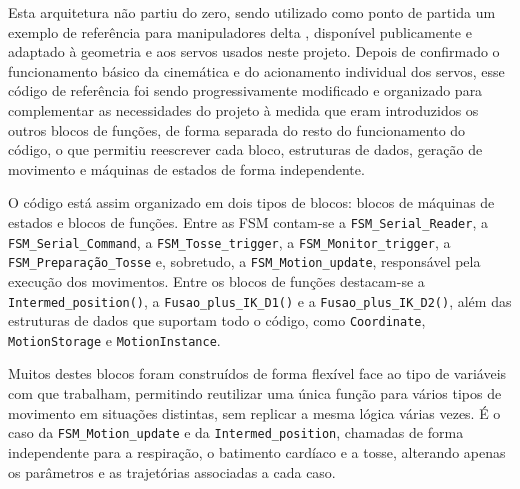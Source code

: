 Esta arquitetura não partiu do zero, sendo utilizado como ponto de partida um exemplo de referência para manipuladores delta \parencite{Isaac2019Delta}, disponível publicamente e adaptado à geometria e aos servos usados neste projeto. Depois de confirmado o funcionamento básico da cinemática e do acionamento individual dos servos, esse código de referência foi sendo progressivamente modificado e organizado para complementar as necessidades do projeto à medida que eram introduzidos os outros blocos de funções, de forma separada do resto do funcionamento do código, o que permitiu reescrever cada bloco, estruturas de dados, geração de movimento e máquinas de estados de forma independente.

O código está assim organizado em dois tipos de blocos: blocos de máquinas de estados e blocos de funções. Entre as FSM contam-se a \texttt{FSM\_Serial\_Reader}, a \texttt{FSM\_Serial\_Command}, a \texttt{FSM\_Tosse\_trigger}, a \texttt{FSM\_Monitor\_trigger}, a \texttt{FSM\_Preparação\_Tosse} e, sobretudo, a \texttt{FSM\_Motion\_update}, responsável pela execução dos movimentos. Entre os blocos de funções destacam-se a \texttt{Intermed\_position()}, a \texttt{Fusao\_plus\_IK\_D1()} e a \texttt{Fusao\_plus\_IK\_D2()}, além das estruturas de dados que suportam todo o código, como \texttt{Coordinate}, \texttt{MotionStorage} e \texttt{MotionInstance}.

Muitos destes blocos foram construídos de forma flexível face ao tipo de variáveis com que trabalham, permitindo reutilizar uma única função para vários tipos de movimento em situações distintas, sem replicar a mesma lógica várias vezes. É o caso da \texttt{FSM\_Motion\_update} e da \texttt{Intermed\_position}, chamadas de forma independente para a respiração, o batimento cardíaco e a tosse, alterando apenas os parâmetros e as trajetórias associadas a cada caso.

